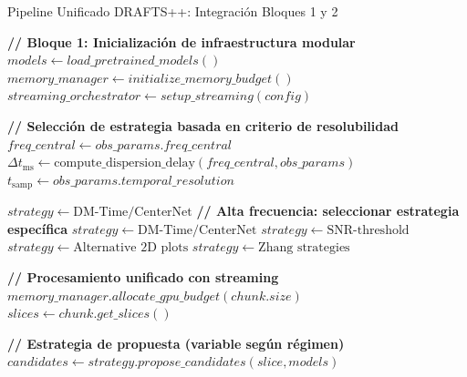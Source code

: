 \begin{algorithm}[H]
\footnotesize
\caption{Pipeline Unificado DRAFTS++: Integración Bloques 1 y 2}
\label{alg:unified-pipeline}
\begin{algorithmic}[1]
    \State \textbf{// Bloque 1: Inicialización de infraestructura modular}
    \State $models \leftarrow load\_pretrained\_models()$ 
    \State $memory\_manager \leftarrow initialize\_memory\_budget()$
    \State $streaming\_orchestrator \leftarrow setup\_streaming(config)$
    
    \State \textbf{// Selección de estrategia basada en criterio de resolubilidad}
    \State $freq\_central \leftarrow obs\_params.freq\_central$
    \State $\Delta t_{\mathrm{ms}} \leftarrow \text{compute\_dispersion\_delay}(freq\_central, obs\_params)$
    \State $t_{\mathrm{samp}} \leftarrow obs\_params.temporal\_resolution$
    
        \State $strategy \leftarrow \text{DM-Time/CenterNet}$ 
    \Else
        \State \textbf{// Alta frecuencia: seleccionar estrategia específica}
            \State $strategy \leftarrow \text{DM-Time/CenterNet}$ 
            \State $strategy \leftarrow \text{SNR-threshold}$ 
            \State $strategy \leftarrow \text{Alternative 2D plots}$ 
            \State $strategy \leftarrow \text{Zhang strategies}$ 
        \EndIf
    \EndIf
    
    \State \textbf{// Procesamiento unificado con streaming}
        \State $memory\_manager.allocate\_gpu\_budget(chunk.size)$
        \State $slices \leftarrow chunk.get\_slices()$
        
            \State \textbf{// Estrategia de propuesta (variable según régimen)}
            \State $candidates \leftarrow strategy.propose\_candidates(slice, models)$
            

\end{algorithmic}
\end{algorithm}
